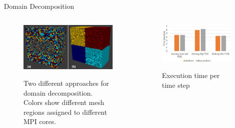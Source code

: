\documentclass[11pt,t]{beamer}
\begin{document}
\begin{frame}[fragile]{Domain Decomposition}

	\begin{columns}[t]
		\begin{column}{.50\textwidth}
			\begin{figure}
			\centering
			\includegraphics[width=\textwidth]{domain_decomp_mesh}
			
			\footnotesize	Two different approaches for domain decomposition. Colors show different mesh regions assigned to different MPI cores.
			\end{figure}
		\end{column}
		\begin{column}{.50\textwidth}

			\begin{figure}
			\centering
			\includegraphics[width=\textwidth]{domain_decomp_result}
			
			\footnotesize	Execution time per time step 
			\end{figure}
		\end{column}
	\end{columns}	
	


\end{frame}
\end{document}
